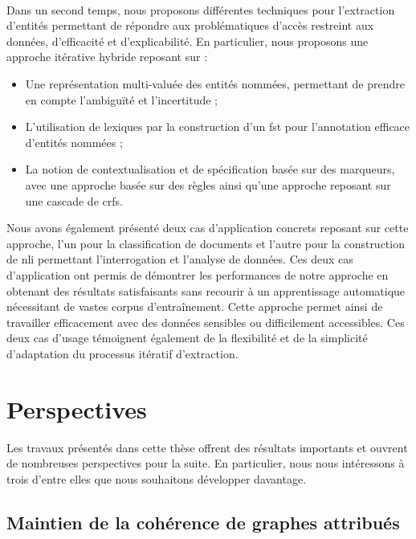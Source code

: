 \paragraph{}
Dans un second temps, nous proposons différentes techniques pour l'extraction d'entités permettant de répondre aux problématiques d'accès restreint aux données, d'efficacité et d'explicabilité.
En particulier, nous proposons une approche itérative hybride reposant sur :
\begin{itemize}
    \item Une représentation multi-valuée des entités nommées, permettant de prendre en compte l'ambiguïté et l'incertitude ;
    
    \item L'utilisation de lexiques par la construction d'un \gls{fst} pour l'annotation efficace d'entités nommées ;
    
    \item La notion de contextualisation et de spécification basée sur des marqueurs, avec une approche basée sur des règles ainsi qu'une approche reposant sur une cascade de \glspl{crf}.
\end{itemize}

Nous avons également présenté deux cas d'application concrets reposant sur cette approche, l'un pour la classification de documents et l'autre pour la construction de \gls{nli} permettant l'interrogation et l'analyse de données.
Ces deux cas d'application ont permis de démontrer les performances de notre approche en obtenant des résultats satisfaisants sans recourir à un apprentissage automatique nécessitant de vastes corpus d'entraînement.
Cette approche permet ainsi de travailler efficacement avec des données sensibles ou difficilement accessibles.
Ces deux cas d'usage témoignent également de la flexibilité et de la simplicité d'adaptation du processus itératif d'extraction.

\section{Perspectives}

Les travaux présentés dans cette thèse offrent des résultats importants et ouvrent de nombreuses perspectives pour la suite.
En particulier, nous nous intéressons à trois d'entre elles que nous souhaitons développer davantage.

\subsection{Maintien de la cohérence de graphes attribués}

